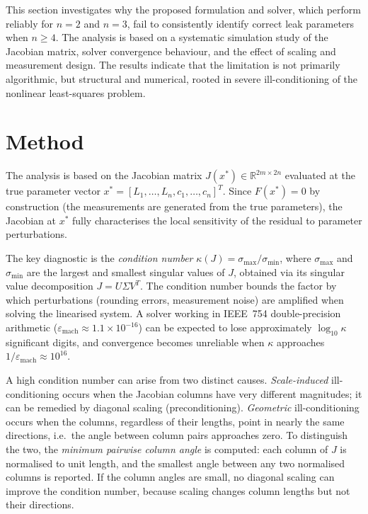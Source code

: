 This section investigates why the proposed formulation and solver, which perform reliably for $n=2$ and $n=3$, fail to consistently identify correct leak parameters when $n \geq 4$. The analysis is based on a systematic simulation study of the Jacobian matrix, solver convergence behaviour, and the effect of scaling and measurement design. The results indicate that the limitation is not primarily algorithmic, but structural and numerical, rooted in severe ill-conditioning of the nonlinear least-squares problem.

\section{Method}\label{sec:cond-method}

The analysis is based on the Jacobian matrix $J(x^*) \in \mathbb{R}^{2m \times 2n}$ evaluated at the true parameter vector $x^* = [L_1, \dots, L_n, c_1, \dots, c_n]^T$.
Since $F(x^*) = 0$ by construction (the measurements are generated from the true parameters), the Jacobian at $x^*$ fully characterises the local sensitivity of the residual to parameter perturbations.

The key diagnostic is the \emph{condition number} $\kappa(J) = \sigma_{\max} / \sigma_{\min}$, where $\sigma_{\max}$ and $\sigma_{\min}$ are the largest and smallest singular values of $J$, obtained via its singular value decomposition $J = U \Sigma V^T$.
The condition number bounds the factor by which perturbations (rounding errors, measurement noise) are amplified when solving the linearised system.
A solver working in IEEE~754 double-precision arithmetic ($\varepsilon_{\mathrm{mach}} \approx 1.1 \times 10^{-16}$) can be expected to lose approximately $\log_{10} \kappa$ significant digits, and convergence becomes unreliable when $\kappa$ approaches $1/\varepsilon_{\mathrm{mach}} \approx 10^{16}$.

A high condition number can arise from two distinct causes.
\emph{Scale-induced} ill-conditioning occurs when the Jacobian columns have very different magnitudes; it can be remedied by diagonal scaling (preconditioning).
\emph{Geometric} ill-conditioning occurs when the columns, regardless of their lengths, point in nearly the same directions, i.e.\ the angle between column pairs approaches zero.
To distinguish the two, the \emph{minimum pairwise column angle} is computed: each column of $J$ is normalised to unit length, and the smallest angle between any two normalised columns is reported.
If the column angles are small, no diagonal scaling can improve the condition number, because scaling changes column lengths but not their directions.

